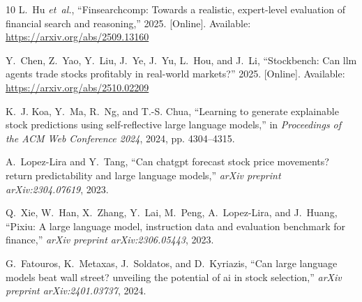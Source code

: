 \documentclass[conference]{IEEEtran}
\begin{document}
\begin{thebibliography}{10}
\BIBentryALTinterwordspacing
L.~Hu \emph{et~al.}, ``Finsearchcomp: Towards a realistic, expert-level evaluation of financial search and reasoning,'' 2025. [Online]. Available: \url{https://arxiv.org/abs/2509.13160}
\BIBentrySTDinterwordspacing

\BIBentryALTinterwordspacing
Y.~Chen, Z.~Yao, Y.~Liu, J.~Ye, J.~Yu, L.~Hou, and J.~Li, ``Stockbench: Can llm agents trade stocks profitably in real-world markets?'' 2025. [Online]. Available: \url{https://arxiv.org/abs/2510.02209}
\BIBentrySTDinterwordspacing

K.~J. Koa, Y.~Ma, R.~Ng, and T.-S. Chua, ``Learning to generate explainable stock predictions using self-reflective large language models,'' in \emph{Proceedings of the ACM Web Conference 2024}, 2024, pp. 4304--4315.

A.~Lopez-Lira and Y.~Tang, ``Can chatgpt forecast stock price movements? return predictability and large language models,'' \emph{arXiv preprint arXiv:2304.07619}, 2023.

Q.~Xie, W.~Han, X.~Zhang, Y.~Lai, M.~Peng, A.~Lopez-Lira, and J.~Huang, ``Pixiu: A large language model, instruction data and evaluation benchmark for finance,'' \emph{arXiv preprint arXiv:2306.05443}, 2023.

G.~Fatouros, K.~Metaxas, J.~Soldatos, and D.~Kyriazis, ``Can large language models beat wall street? unveiling the potential of ai in stock selection,'' \emph{arXiv preprint arXiv:2401.03737}, 2024.

\end{thebibliography}
\end{document}
